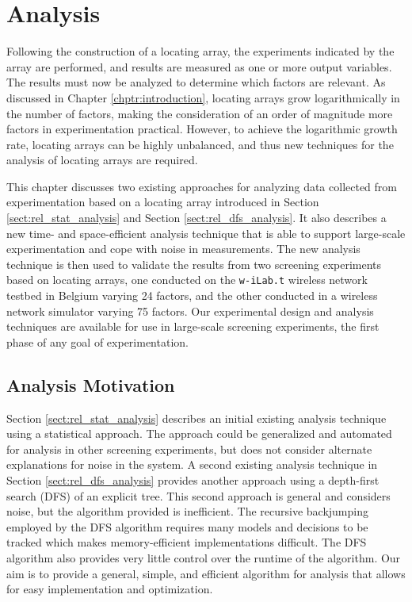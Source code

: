 \chapter{Analysis} \label{chptr:analysis}

Following the construction of a locating array, the experiments indicated by the array are performed, and results are measured as one or more output variables.
The results must now be analyzed to determine which factors are relevant.
As discussed in Chapter \ref{chptr:introduction}, locating arrays grow logarithmically in the number of factors, making the consideration of an order of magnitude more factors in experimentation practical.
However, to achieve the logarithmic growth rate, locating arrays can be highly unbalanced, and thus new techniques for the analysis of locating arrays are required.

This chapter discusses two existing approaches for analyzing data collected from experimentation based on a locating array introduced in Section \ref{sect:rel_stat_analysis} and Section \ref{sect:rel_dfs_analysis}.
It also describes a new time- and space-efficient analysis technique that is able to support large-scale experimentation and cope with noise in measurements.
The new analysis technique is then used to validate the results from two screening experiments based on locating arrays, one conducted on the \texttt{w-iLab.t} wireless network testbed in Belgium varying 24 factors, and the other conducted in a wireless network simulator varying 75 factors.
Our experimental design and analysis techniques are available for use \cite{mehari2017} in large-scale screening experiments, the first phase of any goal of experimentation.

\section{Analysis Motivation} \label{sect:motivation}

Section \ref{sect:rel_stat_analysis} describes an initial existing analysis technique using a statistical approach.
The approach could be generalized and automated for analysis in other screening experiments, but does not consider alternate explanations for noise in the system.
A second existing analysis technique in Section \ref{sect:rel_dfs_analysis} provides another approach using a depth-first search (DFS) of an explicit tree.
This second approach is general and considers noise, but the algorithm provided is inefficient.
The recursive backjumping employed by the DFS algorithm requires many models and decisions to be tracked which makes memory-efficient implementations difficult.
The DFS algorithm also provides very little control over the runtime of the algorithm.
Our aim is to provide a general, simple, and efficient algorithm for analysis that allows for easy implementation and optimization.

